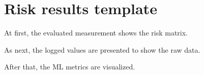 \section{Risk results template}
\label{sec:template}

At first, the evaluated measurement shows the risk matrix.

As next, the logged values are presented to show the raw data.

After that, the ML metrics are visualized.
